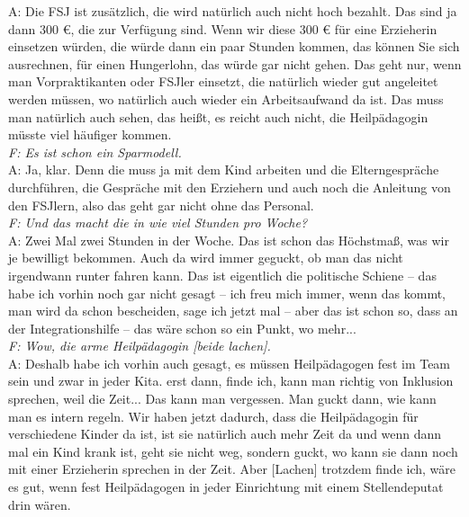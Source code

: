 \begin{linenumbers*}
A: Die FSJ ist zusätzlich, die wird natürlich auch nicht hoch bezahlt. Das sind ja dann 300 €, die zur Verfügung sind. Wenn wir diese 300 € für eine Erzieherin einsetzen würden, die würde dann ein paar Stunden kommen, das können Sie sich ausrechnen, für einen Hungerlohn, das würde gar nicht gehen. Das geht nur, wenn man Vorpraktikanten oder FSJler einsetzt, die natürlich wieder gut angeleitet werden müssen, wo natürlich auch wieder ein Arbeitsaufwand da ist. Das muss man natürlich auch sehen, das heißt, es reicht auch nicht, die Heilpädagogin müsste viel häufiger kommen.\\
\emph{F: Es ist schon ein Sparmodell.}\\
A: Ja, klar. Denn die muss ja mit dem Kind arbeiten und die Elterngespräche durchführen, die Gespräche mit den Erziehern und auch noch die Anleitung von den FSJlern, also das geht gar nicht ohne das Personal.\\
\emph{F: Und das macht die in wie viel Stunden pro Woche?}\\
A: Zwei Mal zwei Stunden in der Woche. Das ist schon das Höchstmaß, was wir je bewilligt bekommen. Auch da wird immer geguckt, ob man das nicht irgendwann runter fahren kann. Das ist eigentlich die politische Schiene -- das habe ich vorhin noch gar nicht gesagt -- ich freu mich immer, wenn das kommt, man wird da schon bescheiden, sage ich jetzt mal -- aber das ist schon so, dass an der Integrationshilfe -- das wäre schon so ein Punkt, wo mehr...\\
\emph{F: Wow, die arme Heilpädagogin {[beide lachen]}.}\\
A: Deshalb habe ich vorhin auch gesagt, es müssen Heilpädagogen fest im Team sein und zwar in jeder Kita. erst dann, finde ich, kann man richtig von Inklusion sprechen, weil die Zeit... Das kann man vergessen. Man guckt dann, wie kann man es intern regeln. Wir haben jetzt dadurch, dass die Heilpädagogin für verschiedene Kinder da ist, ist sie natürlich auch mehr Zeit da und wenn dann mal ein Kind krank ist, geht sie nicht weg, sondern guckt, wo kann sie dann noch mit einer Erzieherin sprechen in der Zeit. Aber {[Lachen]} trotzdem finde ich, wäre es gut, wenn fest Heilpädagogen in jeder Einrichtung mit einem Stellendeputat drin wären. 


\end{linenumbers*}
